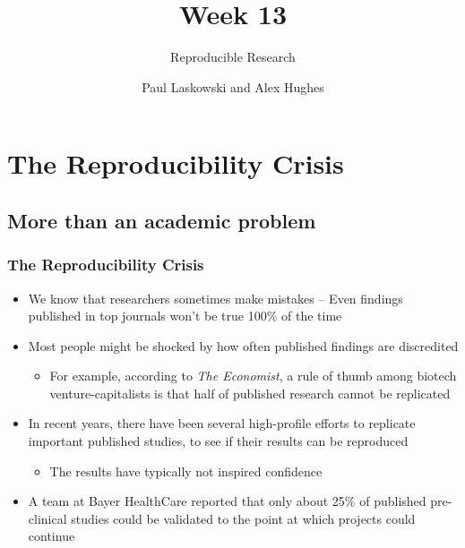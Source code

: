 \documentclass[10pt, block=fill]{beamer}
\title{Week 13}
\subtitle{Reproducible Research}
\author{Paul Laskowski and Alex Hughes}
\institute{UC Berkeley, School of Information}
\begin{document}
\begin{frame}
\maketitle
\end{frame}

\begin{frame}
  \tableofcontents[hideallsubsections]
\end{frame}

\section{The Reproducibility Crisis}
\subsection{More than an academic problem}

\begin{frame}
  \frametitle{The Reproducibility Crisis}

  \begin{itemize}
    \item We know that researchers sometimes make mistakes -- Even findings published in top journals won't be true 100\% of the time
    \item Most people might be shocked by how often published findings are discredited
    \begin{itemize}
      \item For example, according to \textit{The Economist}, a rule of thumb among biotech venture-capitalists is that half of published research cannot be replicated
    \end{itemize}
    \item In recent years, there have been several high-profile efforts to replicate important published studies, to see if their results can be reproduced
    \begin{itemize}
      \item The results have typically not inspired confidence
    \end{itemize}
    \item A team at Bayer HealthCare reported that only about 25\% of published pre-clinical studies could be validated to the point at which projects could continue
  \end{itemize}
  
\end{frame}
\end{document}
